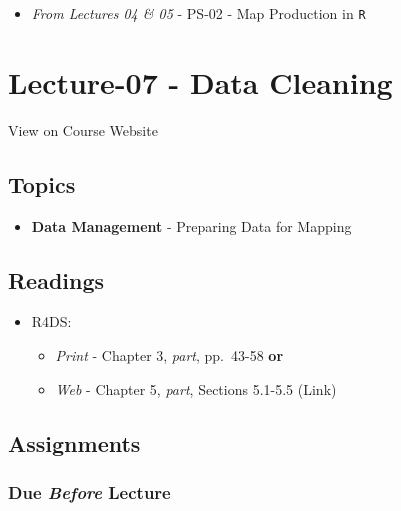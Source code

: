\documentclass[]{book}
\providecommand{\tightlist}{%
  \setlength{\itemsep}{0pt}\setlength{\parskip}{0pt}}
\begin{document}
\begin{itemize}
\tightlist
\item
  \emph{From Lectures 04 \& 05} - PS-02 - Map Production in \texttt{R}
\end{itemize}

\hypertarget{lecture-07---data-cleaning}{%
\section*{Lecture-07 - Data Cleaning}\label{lecture-07---data-cleaning}}

View on Course Website

\hypertarget{topics-7}{%
\subsection*{Topics}\label{topics-7}}

\begin{itemize}
\tightlist
\item
  \textbf{Data Management} - Preparing Data for Mapping
\end{itemize}

\hypertarget{readings-8}{%
\subsection*{Readings}\label{readings-8}}

\begin{itemize}
\tightlist
\item
  R4DS:

  \begin{itemize}
  \tightlist
  \item
    \emph{Print} - Chapter 3, \emph{part}, pp.~43-58 \textbf{or}
  \item
    \emph{Web} - Chapter 5, \emph{part}, Sections 5.1-5.5 (Link)
  \end{itemize}
\end{itemize}

\hypertarget{assignments-8}{%
\subsection*{Assignments}\label{assignments-8}}

\hypertarget{due-before-lecture-6}{%
\subsubsection*{\texorpdfstring{Due \emph{Before} Lecture}{Due Before Lecture}}\label{due-before-lecture-6}}
\end{document}

